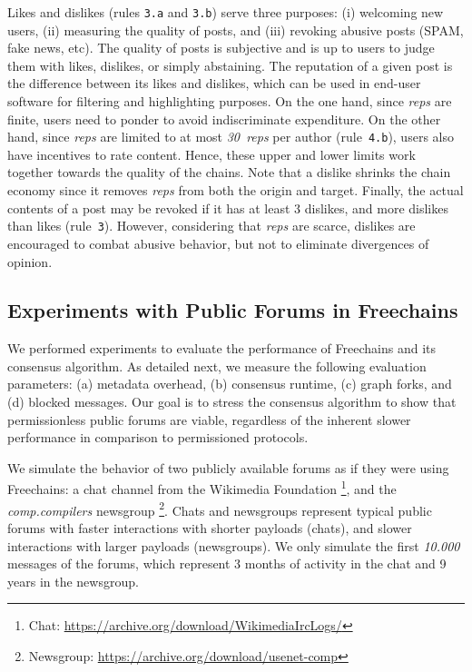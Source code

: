 \documentclass[12pt]{article}
\newcommand{\FC}       {Freechains\xspace}
\newcommand{\reps}     {\emph{reps}\xspace}
\newcommand{\nreps}[1] {\emph{#1~reps\xspace}}
\newcommand{\code}[1]  {\texttt{\footnotesize{#1}}}
\begin{document}
Likes and dislikes (rules \code{3.a} and \code{3.b}) serve three purposes:
    (i) welcoming new users,
    (ii) measuring the quality of posts, and
    (iii) revoking abusive posts (SPAM, fake news, etc).
%
The quality of posts is subjective and is up to users to judge them with likes,
dislikes, or simply abstaining.
%
%
The reputation of a given post is the difference between its likes and
dislikes, which can be used in end-user software for filtering and highlighting
purposes.
%
On the one hand, since \reps are finite, users need to ponder to avoid
indiscriminate expenditure.
On the other hand, since \reps are limited to at most \nreps{30} per author
(rule~\code{4.b}), users also have incentives to rate content.
Hence, these upper and lower limits work together towards the quality of the
chains.
%
Note that a dislike shrinks the chain economy since it removes \reps from both
the origin and target.
Finally, the actual contents of a post may be revoked if it has at least 3
dislikes, and more dislikes than likes (rule~\code{3}).
However, considering that \reps are scarce, dislikes are encouraged to combat
abusive behavior, but not to eliminate divergences of opinion.

\subsection{Experiments with Public Forums in \FC}
\label{sec.evaluation}

We performed experiments to evaluate the performance of \FC and its consensus
algorithm.
%
As detailed next, we measure the following evaluation parameters:
    (a) metadata overhead,
    (b) consensus runtime,
    (c) graph forks, and
    (d) blocked messages.
%
Our goal is to stress the consensus algorithm to show that
permissionless public forums are viable, regardless of the inherent slower
performance in comparison to permissioned protocols.

We simulate the behavior of two publicly available forums as if they were using
\FC:
%
    a chat channel from the Wikimedia Foundation%
\footnote{ Chat: \url{https://archive.org/download/WikimediaIrcLogs/} }, and
    the \emph{comp.compilers} newsgroup%
\footnote{ Newsgroup: \url{https://archive.org/download/usenet-comp} }.
%
Chats and newsgroups represent typical public forums with
    faster interactions with shorter payloads (chats), and
    slower interactions with larger payloads (newsgroups).
%
We only simulate the first \emph{10.000} messages of the forums, which
represent 3 months of activity in the chat and 9 years in the newsgroup.
\end{document}
